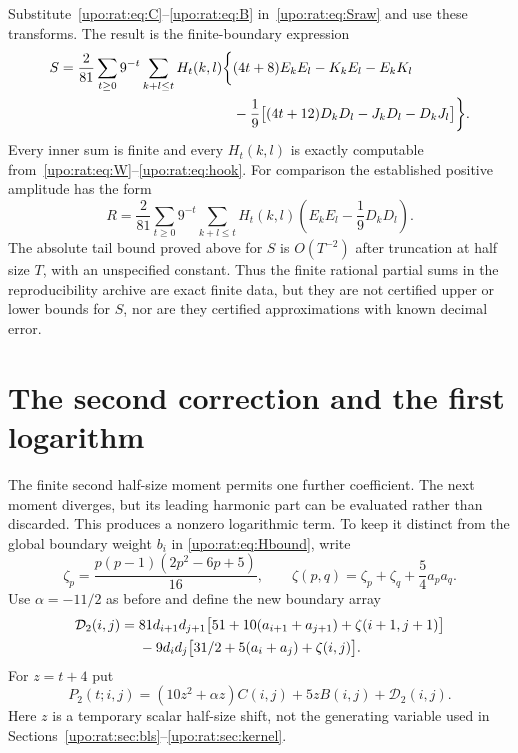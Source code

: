 \documentclass[11pt,letterpaper]{article}
\theoremstyle{remark}\newtheorem{remark}[theorem]{Remark}
\numberwithin{equation}{section}
\begin{document}
Substitute~\eqref{upo:rat:eq:C}--\eqref{upo:rat:eq:B} in~\eqref{upo:rat:eq:Sraw} and use these
transforms. The result is the finite-boundary expression
\begin{align}\label{upo:rat:eq:Sfinite}
S=\frac2{81}\sum_{t\ge0}9^{-t}\sum_{k+l\le t}H_t(k,l)
\biggl\{&(4t+8)E_kE_l-K_kE_l-E_kK_l\notag\\
&-\frac19\bigl[(4t+12)D_kD_l-J_kD_l-D_kJ_l\bigr]\biggr\}.
\end{align}
Every inner sum is finite and every $H_t(k,l)$ is exactly computable
from~\eqref{upo:rat:eq:W}--\eqref{upo:rat:eq:hook}. For comparison the established
positive amplitude has the form
\begin{equation}\label{upo:rat:eq:Rfinite}
R=\frac2{81}\sum_{t\ge0}9^{-t}\sum_{k+l\le t}H_t(k,l)
\left(E_kE_l-\frac19D_kD_l\right).
\end{equation}
The absolute tail bound proved above for $S$ is $O(T^{-2})$ after
truncation at half size $T$, with an unspecified constant. Thus the
finite rational partial sums in the reproducibility archive are exact
finite data, but they are not certified upper or lower bounds for $S$,
nor are they certified approximations with known decimal error.

\section{The second correction and the first logarithm}\label{upo:rat:sec:secondlog}
The finite second half-size moment permits one further coefficient. The
next moment diverges, but its leading harmonic part can be evaluated
rather than discarded. This produces a nonzero logarithmic term.
To keep it distinct from the global boundary weight $b_i$ in
\eqref{upo:rat:eq:Hbound}, write
\begin{equation}\label{upo:rat:eq:zeta}
\zeta_p=\frac{p(p-1)(2p^2-6p+5)}{16},
\qquad \zeta(p,q)=\zeta_p+\zeta_q+\frac54a_pa_q.
\end{equation}
Use $\alpha=-11/2$ as before and define the new boundary array
\begin{align}\label{upo:rat:eq:D2}
\mathcal D_2(i,j)={}&81d_{i+1}d_{j+1}
\bigl[51+10(a_{i+1}+a_{j+1})+\zeta(i+1,j+1)\bigr]\notag\\
&-9d_id_j\bigl[31/2+5(a_i+a_j)+\zeta(i,j)\bigr].
\end{align}
For $z=t+4$ put
\begin{equation}\label{upo:rat:eq:P2}
P_2(t;i,j)=(10z^2+\alpha z)C(i,j)+5zB(i,j)+\mathcal D_2(i,j).
\end{equation}
Here $z$ is a temporary scalar half-size shift, not the generating
variable used in Sections~\ref{upo:rat:sec:bls}--\ref{upo:rat:sec:kernel}.
\end{document}
